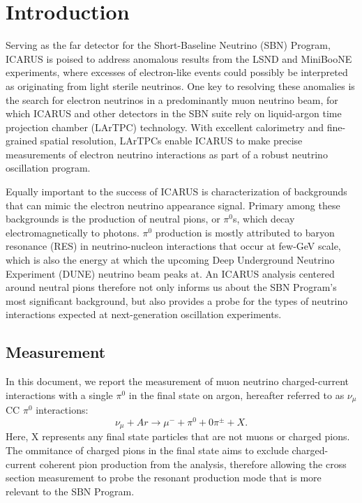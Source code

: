 \documentclass[../main.tex]{subfiles}
\begin{document}
\section{Introduction}
\label{sec:intro}

Serving as the far detector for the Short-Baseline Neutrino (SBN) Program, ICARUS is poised to address anomalous results from the LSND and MiniBooNE experiments, where excesses of electron-like events could possibly be interpreted as originating from light sterile neutrinos. One key to resolving these anomalies is the search for electron neutrinos in a predominantly muon neutrino beam, for which ICARUS and other detectors in the SBN suite rely on liquid-argon time projection chamber (LArTPC) technology.  With excellent calorimetry and fine-grained spatial resolution, LArTPCs enable ICARUS to make precise measurements of electron neutrino interactions as part of a robust neutrino oscillation program.

Equally important to the success of ICARUS is characterization of backgrounds that can mimic the electron neutrino appearance signal.  Primary among these backgrounds is the production of neutral pions, or $\pi^{0}$s, which decay electromagnetically to photons.  $\pi^{0}$ production is mostly attributed to baryon resonance (RES) in neutrino-nucleon interactions that occur at few-GeV scale, which is also the energy at which the upcoming Deep Underground Neutrino Experiment (DUNE) neutrino beam peaks at.  An ICARUS analysis centered around neutral pions therefore not only informs us about the SBN Program's most significant background, but also provides a probe for the types of neutrino interactions expected at next-generation oscillation experiments.

\subsection{Measurement}
In this document, we report the measurement of muon neutrino charged-current interactions with a single $\pi^{0}$ in the final state on argon, hereafter referred to as $\nu_{\mu}$ CC $\pi^{0}$ interactions:
\begin{equation}
    \nu_{\mu} + Ar \rightarrow \mu^{-} + \pi^{0} + 0\pi^{\pm} + X.
\end{equation}
Here, X represents any final state particles that are not muons or charged pions.  The ommitance of charged pions in the final state aims to exclude charged-current coherent pion production from the analysis, therefore allowing the cross section measurement to probe the resonant production mode that is more relevant to the SBN Program.
\end{document}
